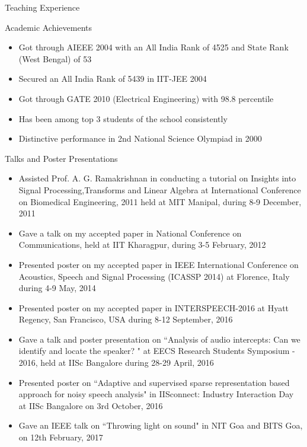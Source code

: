 \documentclass[10pt]{article}
\begin{document}
\begin{cv}
\begin{cvlist}{Teaching Experience}
\end{cvlist}

\begin{cvlist}{Academic Achievements}
\item
\begin{itemize}\itemsep=0.25em
	\item
Got through AIEEE 2004 with an All India Rank of 4525 and State Rank (West Bengal) of 53

\item

 Secured an All India Rank of 5439 in IIT-JEE 2004

\item
Got through GATE 2010 (Electrical Engineering) with 98.8 percentile

\item
Has been among top 3 students of the school consistently

\item
Distinctive performance in 2nd National Science Olympiad in 2000


	\end{itemize}

\end{cvlist}



\begin{cvlist}{Talks and Poster Presentations}
\item
\begin{itemize}
 \item Assisted Prof. A. G. Ramakrishnan in conducting a tutorial on Insights into Signal Processing,Transforms and Linear Algebra at International Conference on Biomedical Engineering, 2011 held at MIT Manipal, during 8-9 December, 2011


\item 

Gave a talk on my accepted paper in  National Conference on Communications,  held at IIT Kharagpur, during 3-5 February, 2012
\item Presented poster on my accepted paper in IEEE International Conference on Acoustics, Speech and Signal Processing (ICASSP 2014) at Florence, Italy  during  4-9 May, 2014

\item 
Presented poster on my accepted paper in INTERSPEECH-2016 at Hyatt Regency, San Francisco, USA during 8-12 September, 2016

\item Gave a talk and poster presentation on ``Analysis of audio intercepts: Can we identify and locate the speaker? " at EECS Research Students Symposium - 2016,  held at IISc Bangalore during 28-29 April, 2016
\item Presented poster on ``Adaptive and supervised sparse representation based approach for noisy speech analysis"  in IISconnect: Industry Interaction Day at IISc  Bangalore on 3rd October, 2016 
\item Gave an IEEE talk on ``Throwing light on sound" in NIT Goa and BITS Goa, on 12th February, 2017
\end{itemize}
\end{cvlist}


\end{cv}
\end{document}
